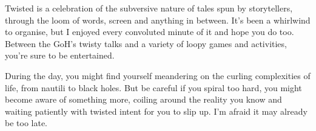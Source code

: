 Twisted is a celebration of the subversive nature of tales spun by storytellers, through the loom of words, screen and anything in between. It’s been a whirlwind to organise, but I enjoyed every convoluted minute of it and hope you do too. Between the GoH’s twisty talks and a variety of loopy games and activities, you’re sure to be entertained.

During the day, you might find yourself meandering on the curling complexities of life, from nautili to black holes. But be careful \textendash{} if you spiral too hard, you might become aware of something more, coiling around the reality you know and waiting patiently with twisted intent for you to slip up. I’m afraid it may already be too late.